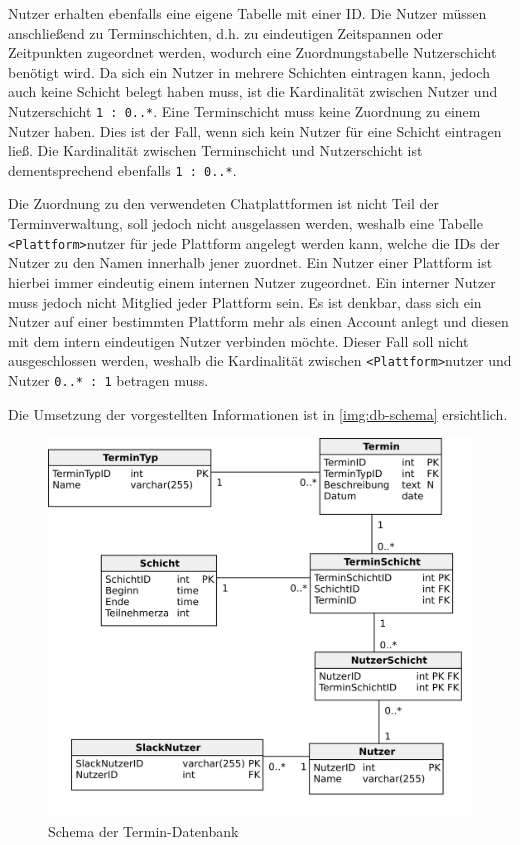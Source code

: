 Nutzer erhalten ebenfalls eine eigene Tabelle mit einer ID. Die Nutzer müssen anschließend zu Terminschichten, d.h. zu eindeutigen Zeitspannen oder Zeitpunkten zugeordnet werden, wodurch eine Zuordnungstabelle Nutzerschicht benötigt wird. Da sich ein Nutzer in mehrere Schichten eintragen kann, jedoch auch keine Schicht belegt haben muss, ist die Kardinalität zwischen Nutzer und Nutzerschicht \texttt{1 : 0..*}. Eine Terminschicht muss keine Zuordnung zu einem Nutzer haben. Dies ist der Fall, wenn sich kein Nutzer für eine Schicht eintragen ließ. Die Kardinalität zwischen Terminschicht und Nutzerschicht ist dementsprechend ebenfalls \texttt{1 : 0..*}.

Die Zuordnung zu den verwendeten Chatplattformen ist nicht Teil der Terminverwaltung, soll jedoch nicht ausgelassen werden, weshalb eine Tabelle \texttt{<Plattform>}nutzer für jede Plattform angelegt werden kann, welche die IDs der Nutzer zu den Namen innerhalb jener zuordnet. Ein Nutzer einer Plattform ist hierbei immer eindeutig einem internen Nutzer zugeordnet. Ein interner Nutzer muss jedoch nicht Mitglied jeder Plattform sein. Es ist denkbar, dass sich ein Nutzer auf einer bestimmten Plattform mehr als einen Account anlegt und diesen mit dem intern eindeutigen Nutzer verbinden möchte. Dieser Fall soll nicht ausgeschlossen werden, weshalb die Kardinalität zwischen \texttt{<Plattform>}nutzer und Nutzer \texttt{0..* : 1} betragen muss.

Die Umsetzung der vorgestellten Informationen ist in \autoref{img:db-schema} ersichtlich.



\begin{figure}[htbp]
    \centering
    \includegraphics[width=\textwidth]{../docs/uml/Steckerbot-DB.png}
    \caption{Schema der Termin-Datenbank}
    \label{img:db-schema}
\end{figure}



